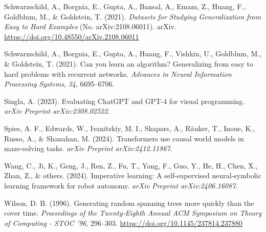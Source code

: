 \documentclass[10pt,a4paper,onecolumn]{article}
\newlength{\cslhangindent}
\newenvironment{CSLReferences}[2] %
 {\begin{list}{}{%
  \setlength{\itemindent}{0pt}
  \setlength{\leftmargin}{0pt}
  \setlength{\parsep}{0pt}
  \ifodd #1
   \setlength{\leftmargin}{\cslhangindent}
   \setlength{\itemindent}{-1\cslhangindent}
  \fi
  \setlength{\itemsep}{#2\baselineskip}}}
 {\end{list}}
\begin{document}
\begin{CSLReferences}{1}{0.5}
\leavevmode{}%
Schwarzschild, A., Borgnia, E., Gupta, A., Bansal, A., Emam, Z., Huang,
F., Goldblum, M., \& Goldstein, T. (2021). \emph{Datasets for {Studying
Generalization} from {Easy} to {Hard Examples}} (No. arXiv:2108.06011).
{arXiv}. \url{https://doi.org/10.48550/arXiv.2108.06011}

\leavevmode{}%
Schwarzschild, A., Borgnia, E., Gupta, A., Huang, F., Vishkin, U.,
Goldblum, M., \& Goldstein, T. (2021). Can you learn an algorithm?
Generalizing from easy to hard problems with recurrent networks.
\emph{Advances in Neural Information Processing Systems}, \emph{34},
6695--6706.

\leavevmode{}%
Singla, A. (2023). Evaluating ChatGPT and GPT-4 for visual programming.
\emph{arXiv Preprint arXiv:2308.02522}.

\leavevmode{}%
Spies, A. F., Edwards, W., Ivanitskiy, M. I., Skapars, A., Räuker, T.,
Inoue, K., Russo, A., \& Shanahan, M. (2024). Transformers use causal
world models in maze-solving tasks. \emph{arXiv Preprint
arXiv:2412.11867}.

\leavevmode{}%
Wang, C., Ji, K., Geng, J., Ren, Z., Fu, T., Yang, F., Guo, Y., He, H.,
Chen, X., Zhan, Z., \& others. (2024). Imperative learning: A
self-supervised neural-symbolic learning framework for robot autonomy.
\emph{arXiv Preprint arXiv:2406.16087}.

\leavevmode{}%
Wilson, D. B. (1996). Generating random spanning trees more quickly than
the cover time. \emph{Proceedings of the Twenty-Eighth Annual {ACM}
Symposium on {Theory} of Computing - {STOC} '96}, 296--303.
\url{https://doi.org/10.1145/237814.237880}

\end{CSLReferences}
\end{document}
